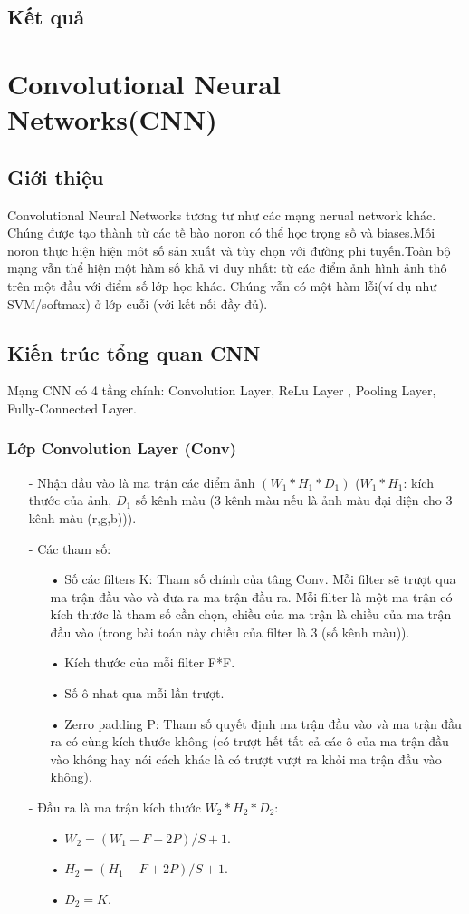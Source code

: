 \documentclass[a4paper,12pt]{report}
\begin{document}
\subsection{Kết quả}
\section{Convolutional Neural Networks(CNN)}
\subsection{Giới thiệu}
Convolutional Neural Networks tương tư như các mạng nerual network khác. Chúng được tạo thành từ các tế bào noron có thể học trọng số và biases.Mỗi noron thực hiện hiện môt số sản xuất và tùy chọn với đường phi tuyến.Toàn bộ mạng vẫn thể hiện một hàm số khả vi duy nhất: từ các điểm ảnh hình ảnh thô trên một đầu với điểm số lớp học khác. Chúng vẫn có một hàm lỗi(ví dụ như SVM/softmax) ở lớp cuỗi (với kết nối đầy đủ).
\subsection{Kiến trúc tổng quan CNN}
Mạng CNN có 4 tầng chính: Convolution Layer, ReLu Layer , Pooling Layer, Fully-Connected Layer.
\subsubsection{Lớp Convolution Layer (Conv)}
\begin{itemize}
\item[-] Nhận đầu vào là ma trận các điểm ảnh $(W_1*H_1*D_1)$ ($W_1*H_1$: kích thước của ảnh, $D_1$ số kênh màu (3 kênh màu nếu là ảnh màu đại diện cho 3 kênh màu (r,g,b))).
\item[-] Các tham số:
\begin{itemize}
\item[•] Số các filters K: Tham số chính của tâng Conv. Mỗi filter sẽ trượt qua ma trận đầu vào và đưa ra ma trận đầu ra. Mỗi filter là một ma trận có kích thước là tham số cần chọn, chiều của ma trận là chiều của ma trận đầu vào (trong bài toán này chiều của filter là 3 (số kênh màu)).
\item[•] Kích thước của mỗi filter F*F.
\item[•] Số ô nhat qua mỗi lần trượt.
\item[•] Zerro padding P: Tham số quyết định ma trận đầu vào và ma trận đầu ra có cùng kích thước không (có trượt hết tất cả các ô của ma trận đầu vào không hay nói cách khác là có trượt vượt ra khỏi ma trận đầu vào không).
\end{itemize}
\item[-] Đầu ra là ma trận kích thước $W_2*H_2*D_2$:
\begin{itemize}
\item[•] $W_2 = (W_1 - F + 2P)/S + 1$.
\item[•] $H_2 = (H_1 - F + 2P)/S + 1$.
\item[•] $D_2 = K$.
\end{itemize}
\end{itemize}
\end{document}
